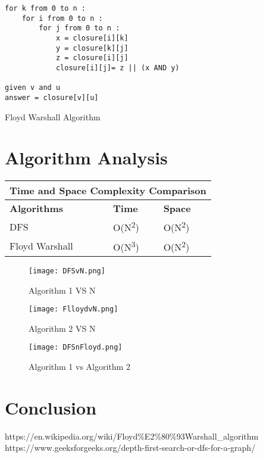 \documentclass[conference]{IEEEtran}
\begin{document}
\begin{algorithm}[H]
\begin{lstlisting}
for k from 0 to n :
    for i from 0 to n :
        for j from 0 to n :
            x = closure[i][k]
            y = closure[k][j]
            z = closure[i][j]
            closure[i][j]= z || (x AND y)

given v and u
answer = closure[v][u]
\end{lstlisting}
 \caption{Floyd Warshall Algorithm}
\end{algorithm}
\bigskip

\section{Algorithm Analysis}
\bigskip
\begin{tabular}{ |p{3cm}||p{1.5cm}|p{1.5cm}| }
 \hline
 \multicolumn{3}{|c|}{Time and Space Complexity Comparison} \\
 \hline
 \textbf{Algorithms} &  \textbf{Time}& \textbf{Space} \\
 \hline
 DFS    &   O(N\textsuperscript{2})  & O(N\textsuperscript{2})\\
 \hline
 Floyd Warshall    &   O(N\textsuperscript{3})  & O(N\textsuperscript{2})\\
 \hline
\end{tabular}





\begin{figure}[h!]
\centerline{\texttt{[image: DFSvN.png]}}
\caption{Algorithm 1 VS N}
\centerline{\textit{ }}
\label{fig:graph}
\end{figure}

\begin{figure}[h!]
\centerline{\texttt{[image: FlloydvN.png]}}
\caption{Algorithm 2 VS N}
\centerline{\textit{ }}
\label{fig:graph}
\end{figure}

\newpage

\begin{figure}[h!]
\centerline{\texttt{[image: DFSnFloyd.png]}}
\caption{Algorithm 1 vs Algorithm 2}
\centerline{\textit{ }}
\label{fig:graph}
\end{figure}

\section{Conclusion}


\begin{thebibliography}{00}
https://en.wikipedia.org/wiki/Floyd\%E2\%80\%93Warshall\_algorithm
https://www.geeksforgeeks.org/depth-first-search-or-dfs-for-a-graph/
\end{thebibliography}
\end{document}
